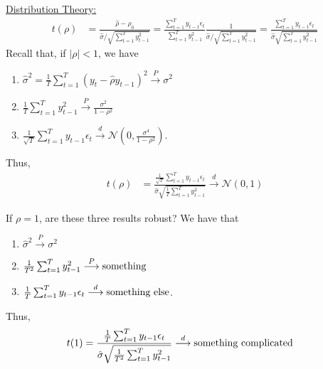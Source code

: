 \documentclass[11pt]{elegantbook}
\begin{document}
\underline{Distribution Theory:}
\begin{equation}
    \begin{aligned}
        t(\rho)&=\frac{\hat{\rho}-\rho_0}{\hat{\sigma}/\sqrt{\sum_{t=1}^Ty_{t-1}^2}}=\frac{\sum_{t=1}^Ty_{t-1}\epsilon_t}{\sum_{t=1}^Ty_{t-1}^2}\frac{1}{\hat{\sigma}/\sqrt{\sum_{t=1}^Ty_{t-1}^2}}=\frac{\sum_{t=1}^Ty_{t-1}\epsilon_t}{\hat{\sigma}\sqrt{\sum_{t=1}^Ty_{t-1}^2}}
    \end{aligned}
    \nonumber
\end{equation}
Recall that, if $|\rho|<1$, we have
\begin{enumerate}
    \item $\hat{\sigma}^2=\frac{1}{T}\sum_{t=1}^T(y_t-\hat{\rho}y_{t-1})^2 \stackrel{P}{\longrightarrow} \sigma^2$
    \item $\frac{1}{T}\sum_{t=1}^Ty_{t-1}^2 \stackrel{P}{\longrightarrow} \frac{\sigma^2}{1-\rho^2}$
    \item $\frac{1}{\sqrt{T}}\sum_{t=1}^Ty_{t-1}\epsilon_t \stackrel{d}{\longrightarrow} \mathcal{N}\left(0,\frac{\sigma^4}{1-\rho^2}\right)$.
\end{enumerate}
Thus,
\begin{equation}
    \begin{aligned}
        t(\rho)&=\frac{\frac{1}{\sqrt{T}}\sum_{t=1}^Ty_{t-1}\epsilon_t}{\hat{\sigma}\sqrt{\frac{1}{T}\sum_{t=1}^Ty_{t-1}^2}} \stackrel{d}{\longrightarrow} \mathcal{N}(0,1)
    \end{aligned}
    \nonumber
\end{equation}

\begin{note}
    If $\rho=1$, are these three results robust? We have that
    \begin{enumerate}
        \item $\hat{\sigma}^2\stackrel{P}{\longrightarrow} \sigma^2$
        \item $\frac{1}{T^2}\sum_{t=1}^Ty_{t-1}^2 \stackrel{P}{\longrightarrow} \textnormal{something}$
        \item $\frac{1}{T}\sum_{t=1}^Ty_{t-1}\epsilon_t \stackrel{d}{\longrightarrow} \textnormal{something else}$.
    \end{enumerate}
\end{note}
Thus,
\begin{equation}
    \begin{aligned}
        t(1)&=\frac{\frac{1}{T}\sum_{t=1}^Ty_{t-1}\epsilon_t}{\hat{\sigma}\sqrt{\frac{1}{T^2}\sum_{t=1}^Ty_{t-1}^2}} \stackrel{d}{\longrightarrow} \textnormal{something complicated}
    \end{aligned}
    \nonumber
\end{equation}
\end{document}
